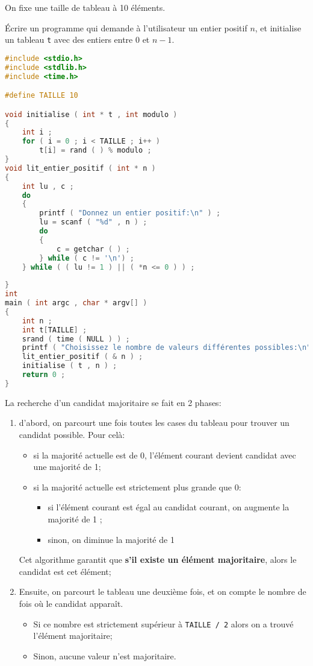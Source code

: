 On fixe une taille de tableau à 10 éléments.


\question Écrire un programme qui demande à l'utilisateur un entier
positif \(n\), et initialise un tableau \texttt{t} avec des entiers
entre \(0\) et \(n-1\).

\begin{solution}
  \begin{lstlisting}[language=C]
#include <stdio.h>
#include <stdlib.h>
#include <time.h>

#define TAILLE 10

void initialise ( int * t , int modulo )
{
    int i ;
    for ( i = 0 ; i < TAILLE ; i++ )
        t[i] = rand ( ) % modulo ;
}
void lit_entier_positif ( int * n )
{
    int lu , c ;
    do
    {
        printf ( "Donnez un entier positif:\n" ) ;
        lu = scanf ( "%d" , n ) ;
        do
        {
            c = getchar ( ) ;
        } while ( c != '\n') ;
    } while ( ( lu != 1 ) || ( *n <= 0 ) ) ;
    
}
int 
main ( int argc , char * argv[] )
{
    int n ;
    int t[TAILLE] ;
    srand ( time ( NULL ) ) ;
    printf ( "Choisissez le nombre de valeurs différentes possibles:\n" ) ;
    lit_entier_positif ( & n ) ;
    initialise ( t , n ) ;
    return 0 ;
}

  \end{lstlisting}
\end{solution}

La recherche d'un candidat majoritaire se fait en 2 phases:
\begin{enumerate}
\item d'abord, on parcourt une fois toutes les cases du tableau pour trouver
  un candidat possible. Pour celà:
  \begin{itemize}
  \item si la majorité actuelle est de 0, l'élément courant devient candidat avec une majorité de 1;
  \item si la majorité actuelle est strictement plus grande que 0:
    \begin{itemize}
    \item si l'élément courant est égal au candidat courant, on augmente la majorité de 1 ;
    \item sinon, on diminue la majorité de 1
    \end{itemize}
  \end{itemize}
  Cet algorithme garantit que \textbf{s'il existe un élément majoritaire}, alors le candidat est cet élément;
\item Ensuite, on parcourt le tableau une deuxième fois, et on compte
  le nombre de fois où le candidat apparaît.
  \begin{itemize}
  \item Si ce nombre est strictement supérieur à \texttt{TAILLE / 2}
    alors on a trouvé l'élément majoritaire;
  \item Sinon, aucune valeur n'est majoritaire.
  \end{itemize}
\end{enumerate}

